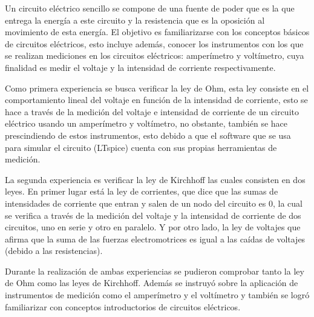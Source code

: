 \documentclass[letterpaper,11pt]{article} %
\begin{document}
	



\begin{resumen}
Un circuito eléctrico sencillo se compone de una fuente de poder que es la que entrega la energía a este circuito y la resistencia que es la oposición al movimiento de esta energía. El objetivo es familiarizarse con los conceptos básicos de circuitos eléctricos, esto incluye además, conocer los instrumentos con los que se realizan mediciones en los circuitos eléctricos: amperímetro y voltímetro, cuya finalidad es medir el voltaje y la intensidad de corriente respectivamente. 

Como primera experiencia se busca verificar la ley de Ohm, esta ley consiste en el comportamiento lineal del voltaje en función de la intensidad de corriente, esto se hace a través de la medición del voltaje e intensidad de corriente de un circuito eléctrico usando un amperímetro y voltímetro, no obstante, también se hace prescindiendo de estos instrumentos, esto debido a que el software que se usa para simular el circuito (LTspice) cuenta con sus propias herramientas de medición.

La segunda experiencia es verificar la ley de Kirchhoff las cuales consisten en dos leyes. En primer lugar está la ley de corrientes, que dice que las sumas de intensidades de corriente que entran y salen de un nodo del circuito es 0, la cual se verifica a través de la medición del voltaje y la intensidad de corriente de dos circuitos, uno en serie y otro en paralelo. Y por otro lado, la ley de  voltajes que afirma que la suma de las fuerzas electromotrices es igual a las caídas de voltajes (debido a las resistencias).

Durante la realización de ambas experiencias se pudieron comprobar tanto la ley de Ohm como las leyes de Kirchhoff. Además se instruyó sobre la aplicación de instrumentos de medición como el amperímetro y el voltímetro y también se logró familiarizar con conceptos introductorios de circuitos eléctricos.


\end{resumen}



\end{document}
